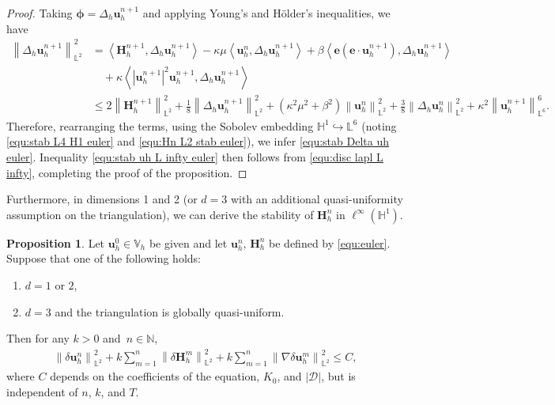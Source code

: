 \documentclass[11pt, reqno]{amsart}
\theoremstyle{definition}
\newtheorem{proposition}[theorem]{Proposition}
\theoremstyle{remark}
\numberwithin{equation}{section}
\newcommand{\bff}{\boldsymbol}
\newcommand{\bb}{\mathbb}
\newcommand{\norm}[2]{\left\|{#1}\right\|_{#2}}
\newcommand{\inpro}[2]{\left\langle#1,#2\right\rangle}
\newcommand{\abs}[1]{\left|{#1}\right|}
\begin{document}
\begin{proof}
	Taking $\bff{\phi}=\Delta_h \bff{u}_h^{n+1}$ and applying Young's and H\"older's inequalities, we have
	\begin{align*}
		\norm{\Delta_h \bff{u}_h^{n+1}}{\bb{L}^2}^2
		&=
		\inpro{\bff{H}_h^{n+1}}{\Delta_h \bff{u}_h^{n+1}}
		-
		\kappa \mu \inpro{\bff{u}_h^n}{\Delta_h \bff{u}_h^{n+1}}
		+
		\beta \inpro{\bff{e}(\bff{e}\cdot \bff{u}_h^{n+1})}{\Delta_h \bff{u}_h^{n+1}}
		\\
		&\quad
		+
		\kappa \inpro{\abs{\bff{u}_h^{n+1}}^2 \bff{u}_h^{n+1}}{\Delta_h \bff{u}_h^{n+1}}
		\\
		&\leq
		2\norm{\bff{H}_h^{n+1}}{\bb{L}^2}^2
		+
		\frac{1}{8} \norm{\Delta_h \bff{u}_h^{n+1}}{\bb{L}^2}^2
		+
		(\kappa^2 \mu^2+\beta^2) \norm{\bff{u}_h^n}{\bb{L}^2}^2
		+
		\frac{3}{8} \norm{\Delta_h \bff{u}_h^n}{\bb{L}^2}^2
		+
		\kappa^2 \norm{\bff{u}_h^{n+1}}{\bb{L}^6}^6.
	\end{align*}
	Therefore, rearranging the terms, using the Sobolev embedding $\bb{H}^1 \hookrightarrow \bb{L}^6$ (noting \eqref{equ:stab L4 H1 euler} and \eqref{equ:Hn L2 stab euler}), we infer \eqref{equ:stab Delta uh euler}.
	Inequality \eqref{equ:stab uh L infty euler} then follows from \eqref{equ:disc lapl L infty}, completing the proof of the proposition.
\end{proof}

Furthermore, in dimensions 1 and 2 (or $d=3$ with an additional quasi-uniformity assumption on the triangulation), we can derive the stability of $\bff{H}_h^n$ in $\ell^\infty(\bb{H}^1)$.

\begin{proposition}\label{pro:dt un stab euler}
Let $\bff{u}_h^0 \in \bb{V}_h$ be given and let $\bff{u}_h^n$, $\bff{H}_h^{n}$ be defined by \eqref{equ:euler}. Suppose that one of the following holds:
\begin{enumerate}
	\item $d=1$ or $2$,
	\item $d=3$ and the triangulation is globally quasi-uniform.
\end{enumerate}
Then for any $k>0$ and~$n\in \bb{N}$,
\begin{align}\label{equ:dt un stab euler}
	\norm{\delta \bff{u}_h^n}{\bb{L}^2}^2
	+
	k \sum_{m=1}^n \norm{\delta \bff{H}_h^m}{\bb{L}^2}^2
	+
	k \sum_{m=1}^n \norm{\nabla \delta \bff{u}_h^m}{\bb{L}^2}^2
	\leq
	C,
\end{align}
where $C$ depends on the coefficients of the equation, $K_0$, and $|\mathscr{D}|$, but is independent of $n$, $k$, and $T$.
\end{proposition}
\end{document}

